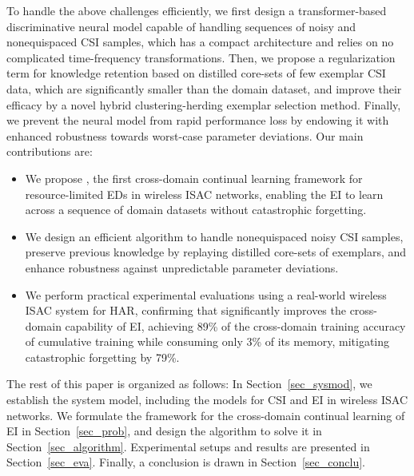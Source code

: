 To handle the above challenges efficiently, we first design a transformer-based discriminative neural model capable of handling sequences of noisy and nonequispaced CSI samples, which has a compact architecture and relies on no complicated time-frequency transformations.
Then, we propose a regularization term for knowledge retention based on distilled core-sets of few exemplar CSI data, which are significantly smaller than the domain dataset, and improve their efficacy by a novel hybrid clustering-herding exemplar selection method.
Finally, we prevent the neural model from rapid performance loss by endowing it with enhanced robustness towards worst-case parameter deviations.
Our main contributions are:
\begin{itemize}[leftmargin=*]
    \item We propose \name, the first cross-domain continual learning framework for resource-limited EDs in wireless ISAC networks, enabling the EI to learn across a sequence of domain datasets without catastrophic forgetting.
    \item We design an efficient algorithm to handle nonequispaced noisy CSI samples, preserve previous knowledge by replaying distilled core-sets of exemplars, and enhance robustness against unpredictable parameter deviations.
    \item We perform practical experimental evaluations using a real-world wireless ISAC system for HAR, confirming that \name significantly improves the cross-domain capability of EI, achieving 89\% of the cross-domain training accuracy of cumulative training while consuming only 3\% of its memory, mitigating catastrophic forgetting by 79\%.
    \end{itemize}

    The rest of this paper is organized as follows: In Section~\ref{sec_sysmod}, we establish the system model, including the models for CSI and EI in wireless ISAC networks.
    We formulate the \name framework for the cross-domain continual learning of EI in Section~\ref{sec_prob}, and design the algorithm to solve it in Section~\ref{sec_algorithm}.
    Experimental setups and results are presented in Section~\ref{sec_eva}.
    Finally, a conclusion is drawn in Section~\ref{sec_conclu}.
    
 

\endinput